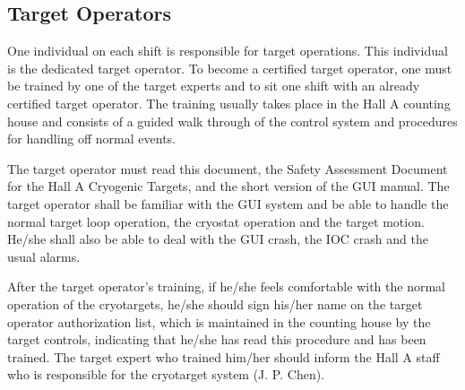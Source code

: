 

\subsection{Target Operators}

One individual on each shift is responsible for target operations.
This individual is the dedicated target operator. To become a certified
target operator, one must be trained by one of the target experts
and to sit one shift with an already certified target operator. The
training usually takes place in the Hall A counting house and consists
of a guided walk through of the control system and procedures for
handling off normal events.

The target operator must read this document, the Safety Assessment
Document for the Hall A Cryogenic Targets, and the short version of
the GUI manual. The target operator shall be familiar with the GUI
system and be able to handle the normal target loop operation, the
cryostat operation and the target motion. He/she shall also be able
to deal with the GUI crash, the IOC crash and the usual alarms. 

After the target operator's training, if he/she feels comfortable
with the normal operation of the cryotargets, he/she should sign his/her
name on the target operator authorization list, which is  maintained in the
counting house by the target controls, indicating that he/she
has read this procedure and has been trained. The target expert who
trained him/her should inform the Hall A staff who is responsible
for the cryotarget system (J. P. Chen). 

